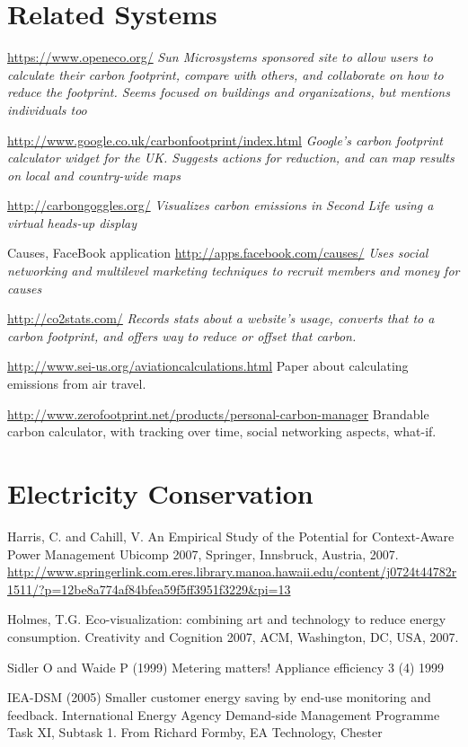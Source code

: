 \section{Related Systems}

\url{https://www.openeco.org/} \emph{Sun Microsystems sponsored site to allow users to calculate their carbon footprint, compare with others, and collaborate on how to reduce the footprint. Seems focused on buildings and organizations, but mentions individuals too}

\url{http://www.google.co.uk/carbonfootprint/index.html} \emph{Google's carbon footprint calculator widget for the UK. Suggests actions for reduction, and can map results on local and country-wide maps}

\url{http://carbongoggles.org/} \emph{Visualizes carbon emissions in Second Life using a virtual heads-up display}

Causes, FaceBook application \url{http://apps.facebook.com/causes/} \emph{Uses social networking and multilevel marketing techniques to recruit members and money for causes}

\url{http://co2stats.com/} \emph{Records stats about a website's usage, converts that to a carbon footprint, and offers way to reduce or offset that carbon.}

\url{http://www.sei-us.org/aviationcalculations.html} Paper about calculating \COtwo emissions from air travel.

\url{http://www.zerofootprint.net/products/personal-carbon-manager} Brandable carbon calculator, with tracking over time, social networking aspects, what-if.


\section{Electricity Conservation}

Harris, C. and Cahill, V. An Empirical Study of the Potential for Context-Aware Power Management Ubicomp 2007, Springer, Innsbruck, Austria, 2007. \url{http://www.springerlink.com.eres.library.manoa.hawaii.edu/content/j0724t44782r1511/?p=12be8a774af84bfea59f5ff3951f3229&pi=13}

Holmes, T.G. Eco-visualization: combining art and technology to reduce energy consumption. Creativity and Cognition 2007, ACM, Washington, DC, USA, 2007.

Sidler O and Waide P (1999) Metering matters! Appliance efficiency 3 (4) 1999

IEA-DSM (2005) Smaller customer energy saving by end-use monitoring and feedback. International Energy Agency Demand-side Management Programme Task XI, Subtask 1. From Richard Formby, EA Technology, Chester 

